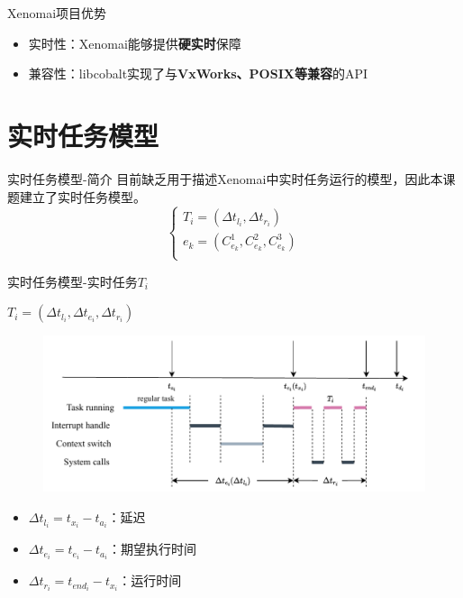 \documentclass{beamer}
\begin{document}
\begin{frame}{Xenomai项目优势}
    \begin{itemize}
        \item 实时性：Xenomai能够提供\textbf{硬实时}保障
        \item 兼容性：libcobalt实现了与\textbf{VxWorks、POSIX等兼容}的API
    \end{itemize}
\end{frame}

\section{实时任务模型}

\begin{frame}{实时任务模型-简介}
    目前缺乏用于描述Xenomai中实时任务运行的模型，因此本课题建立了实时任务模型。
    \begin{equation}
        \begin{cases}
            T_i=(\Delta t_{l_i}, \Delta t_{r_i}) \\
            e_k=(C_{e_{k}}^1,C_{e_{k}}^2,C_{e_{k}}^3) \\
        \end{cases}
    \end{equation}
\end{frame}

\begin{frame}{实时任务模型-实时任务$T_i$}
    \begin{center}
        $T_i=(\Delta t_{l_i}, \Delta t_{e_i}, \Delta t_{r_i})$
    \end{center}
    \begin{figure}[h]
        \centering
        \includegraphics[height=.45\textheight]{img/Img/time-line.pdf}
    \end{figure}
    \begin{itemize}
        \item $\Delta t_{l_i} = t_{x_i}-t_{a_i}$：延迟
        \item $\Delta t_{e_i} = t_{e_i}-t_{a_i}$：期望执行时间
        \item $\Delta t_{r_i} = t_{end_i} - t_{x_i}$：运行时间
    \end{itemize}
\end{frame}
\end{document}
